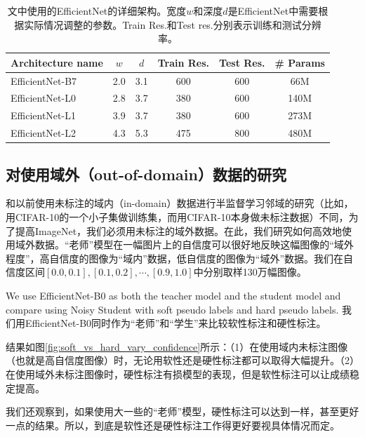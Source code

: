 \documentclass[10pt]{article}
\begin{document}
\begin{table}[h!]
	\centering
	\footnotesize
	\begin{tabular}{l|ccccc}
		\toprule
		Architecture name & $w$ & $d$  & Train Res. & Test Res. & \# Params \\
		\midrule
		EfficientNet-B7 & 2.0 & 3.1 & 600 & 600 & 66M \\
		\midrule
		EfficientNet-L0& 2.8 & 3.7 & 380 & 600 & 140M \\
		EfficientNet-L1& 3.9 & 3.7 & 380 & 600 & 273M \\
		EfficientNet-L2& 4.3 & 5.3 & 475 & 800 & 480M \\
		\bottomrule
	\end{tabular}
	\caption{文中使用的EfficientNet的详细架构。宽度$w$和深度$d$是EfficientNet中需要根据实际情况调整的参数\cite{tan2019efficientnet}。Train Res.和Test res.分别表示训练和测试分辨率。}
	\label{tab:efficientnet_architectures}
\end{table}


\subsection{对使用域外（out-of-domain）数据的研究}
和以前使用未标注的域内（in-domain）数据进行半监督学习邻域的研究（比如，用CIFAR-10的一个小子集做训练集，而用CIFAR-10本身做未标注数据）不同，为了提高ImageNet，我们必须用未标注的域外数据。在此，我们研究如何高效地使用域外数据。“老师”模型在一幅图片上的自信度可以很好地反映这幅图像的“域外程度”，高自信度的图像为“域内”数据，低自信度的图像为“域外”数据。我们在自信度区间$[0.0, 0.1], [0.1, 0.2], \cdots, [0.9, 1.0]$中分别取样130万幅图像。  

We use EfficientNet-B0 as both the teacher model and the student model and compare using Noisy Student with soft pseudo labels and hard pseudo labels. 
我们用EfficientNet-B0同时作为“老师”和“学生”来比较软性标注和硬性标注。 


结果如图\ref{fig:soft_vs_hard_vary_confidence}所示：（1）在使用域内未标注图像（也就是高自信度图像）时，无论用软性还是硬性标注都可以取得大幅提升。（2）在使用域外未标注图像时，硬性标注有损模型的表现，但是软性标注可以让成绩稳定提高。  

我们还观察到，如果使用大一些的“老师”模型，硬性标注可以达到一样，甚至更好一点的结果。所以，到底是软性还是硬性标注工作得更好要视具体情况而定。
\end{document}
